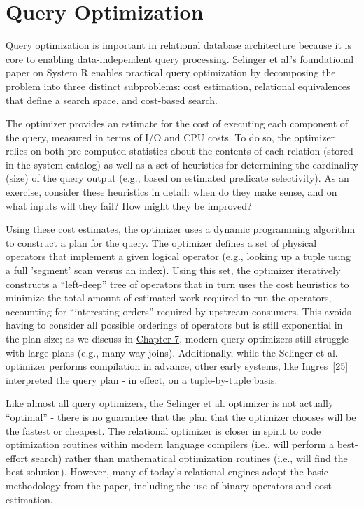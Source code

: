 \documentclass[b5paper,11pt,twoside,openright]{book}
\newcommand\Section[2]{
  \hypertarget{#1}{
    \section{#2}\label{#1}
  }
}
\begin{document}
\Section{query-optimization}{Query Optimization}

Query optimization is important in relational database architecture
because it is core to enabling data-independent query processing.
Selinger et al.'s foundational paper on System R enables practical query
optimization by decomposing the problem into three distinct subproblems:
cost estimation, relational equivalences that define a search space, and
cost-based search.

The optimizer provides an estimate for the cost of executing each
component of the query, measured in terms of I/O and CPU costs. To do
so, the optimizer relies on both pre-computed statistics about the
contents of each relation (stored in the system catalog) as well as a
set of heuristics for determining the cardinality (size) of the query
output (e.g., based on estimated predicate selectivity). As an exercise,
consider these heuristics in detail: when do they make sense, and on
what inputs will they fail? How might they be improved?

Using these cost estimates, the optimizer uses a dynamic programming
algorithm to construct a plan for the query. The optimizer defines a set
of physical operators that implement a given logical operator (e.g.,
looking up a tuple using a full 'segment' scan versus an index). Using
this set, the optimizer iteratively constructs a ``left-deep'' tree of
operators that in turn uses the cost heuristics to minimize the total
amount of estimated work required to run the operators, accounting for
``interesting orders'' required by upstream consumers. This avoids
having to consider all possible orderings of operators but is still
exponential in the plan size; as we discuss in
\hyperref[ch7-queryoptimization]{Chapter 7}, modern query optimizers
still struggle with large plans (e.g., many-way joins). Additionally,
while the Selinger et al. optimizer performs compilation in advance,
other early systems, like
Ingres~{{[}\protect\hyperlink{ref-ingres}{25}{]}} interpreted the query
plan - in effect, on a tuple-by-tuple basis.

Like almost all query optimizers, the Selinger et al. optimizer is not
actually ``optimal'' - there is no guarantee that the plan that the
optimizer chooses will be the fastest or cheapest. The relational
optimizer is closer in spirit to code optimization routines within
modern language compilers (i.e., will perform a best-effort search)
rather than mathematical optimization routines (i.e., will find the best
solution). However, many of today's relational engines adopt the basic
methodology from the paper, including the use of binary operators and
cost estimation.
\end{document}
